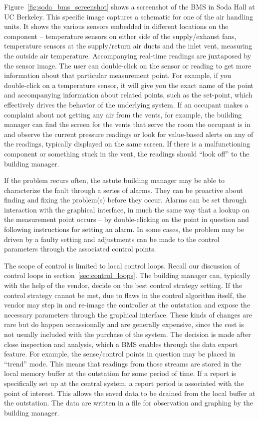 Figure~\ref{fig:soda_bms_screenshot} shows a screenshot of the BMS in Soda Hall at UC Berkeley.  This specific image
captures a schematic for one of the air handling units.  It shows the various sensors embedded in different locations
on the component -- temperature sensors on either side of the supply/exhaust fans, temperature sensors at the supply/return 
air ducts and the inlet vent, measuring the outside air temperature.  Accompanying real-time readings are juxtaposed
by the sensor image.  The user can double-click on the sensor or reading to get more information about that particular 
measurement point.  For example, if you double-click on a temperature sensor, it will give you the exact name of the 
point and accompanying information about related points, such as the set-point, which effectively drives the behavior of 
the underlying system.  If an occupant makes a complaint about not getting any air from the vents, for example, the 
building manager can find the screen for the vents that serve the room the occupant is in and observe the current
pressure readings or look for value-based alerts on any of the readings, typically displayed on the same screen.
If there is a malfunctioning component or something stuck in the vent, the readings should ``look off'' to the building 
manager.

If the problem recurs often, the astute building manager may be able to characterize the fault through a series of alarms.
They can be proactive about finding and fixing the problem(s) before they occur.  Alarms can be set through interaction
with the graphical interface, in much the same way that a lookup on the measurement point occurs -- by double-clicking on 
the point in question and following instructions for setting an alarm.  In some cases, the problem may be driven 
by a faulty setting and adjustments can be made to the control parameters through the associated control points.

The scope of control is limited to local control loops.  Recall our discussion of control loops in section~\ref{sec:control_loops}.
The building manager can, typically with the help of the vendor, decide on the best control strategy setting.  If the control
strategy cannot be met, due to flaws in the control algorithm itself, the vendor may step in and re-image the controller
at the outstation and expose the necessary parameters through the graphical interface.  These kinds of changes are rare
but do happen occassionally and are generally expensive, since the cost is not usually included with the purchase
of the system.  The decision is made after close inspection and analysis, which a BMS enables through the data export feature.  
For example, the sense/control points in question may be placed in ``trend'' mode.  This means that readings
from those streams are stored in the local memory buffer at the outstation for some period of time.  If a report is specifically
set up at the central system, a report period is associated with the point of interest. This allows the saved data to be drained
from the local buffer at the outstation.  The data are written in a file for observation and graphing by the 
building manager.  %

